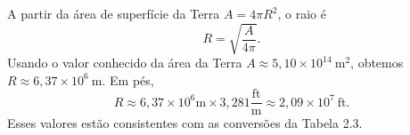 A partir da área de superfície da Terra $A=4\pi R^{2}$, o raio é
\[
R=\sqrt{\frac{A}{4\pi}}.
\]
Usando o valor conhecido da área da Terra $A\approx5{,}10\times10^{14}\ \mathrm{m^{2}}$, obtemos $R\approx6{,}37\times10^{6}\ \mathrm{m}$. Em pés,
\[
R\approx6{,}37\times10^{6}\mathrm{m}\times3{,}281\frac{\mathrm{ft}}{\mathrm{m}}\approx2{,}09\times10^{7}\ \mathrm{ft}.
\]
Esses valores estão consistentes com as conversões da Tabela 2.3. 